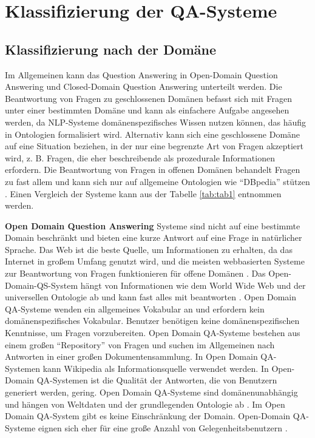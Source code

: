 \documentclass[
        ngerman,
        paper=a4,
        numbers=noendperiod,
]{scrreprt}
\begin{document}
\section{Klassifizierung der QA-Systeme}
\subsection{Klassifizierung nach der Domäne}
Im Allgemeinen kann das Question Answering in Open-Domain Question Answering und Closed-Domain Question Answering unterteilt werden. Die Beantwortung von Fragen zu geschlossenen Domänen befasst sich mit Fragen unter einer bestimmten Domäne und kann als einfachere Aufgabe angesehen werden, da NLP-Systeme domänenspezifisches Wissen nutzen können, das häufig in Ontologien formalisiert wird. Alternativ kann sich eine geschlossene Domäne auf eine Situation beziehen, in der nur eine begrenzte Art von Fragen akzeptiert wird, z. B. Fragen, die eher beschreibende als prozedurale Informationen erfordern. Die Beantwortung von Fragen in offenen Domänen behandelt Fragen zu fast allem und kann sich nur auf allgemeine Ontologien wie \enquote{DBpedia} stützen \citep{Mervin2013AnSystem}. Einen Vergleich der Systeme kann aus der Tabelle \ref{tab:tab1} entnommen werden.

\textbf{Open Domain Question Answering} Systeme sind nicht auf eine bestimmte Domain beschränkt und bieten eine kurze Antwort auf eine Frage in natürlicher Sprache. Das Web ist die beste Quelle, um Informationen zu erhalten, da das Internet in großem Umfang genutzt wird, und die meisten webbasierten Systeme zur Beantwortung von Fragen funktionieren für offene Domänen \citep{yogish2016survey}. Das Open-Domain-QS-System hängt von Informationen wie dem World Wide Web und der universellen Ontologie ab und kann fast alles mit beantworten \citep{SreelakshmiOPENLABELING}. Open Domain QA-Systeme wenden ein allgemeines Vokabular an und erfordern kein domänenspezifisches Vokabular. Benutzer benötigen keine domänenspezifischen Kenntnisse, um Fragen vorzubereiten. Open Domain QA-Systeme bestehen aus einem großen \enquote{Repository} von Fragen und suchen im Allgemeinen nach Antworten in einer großen Dokumentensammlung. In Open Domain QA-Systemen kann Wikipedia als Informationsquelle verwendet werden. In Open-Domain QA-Systemen ist die Qualität der Antworten, die von Benutzern generiert werden, gering. Open Domain QA-Systeme sind domänenunabhängig und hängen von Weltdaten und der grundlegenden Ontologie ab \citep{biswas2014framework}. Im Open Domain QA-System gibt es keine Einschränkung der Domain. Open-Domain QA-Systeme eignen sich eher für eine große Anzahl von Gelegenheitsbenutzern \citep[S. 20]{ChandraASystem}.
\end{document}
